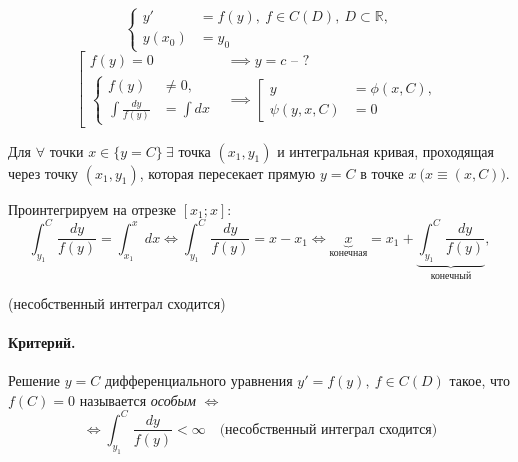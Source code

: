 \documentclass[11pt,a4paper,oneside]{report}
\theoremstyle{definition}
\theoremstyle{plain}
\theoremstyle{remark}
\begin{document}
\begin{equation*}
    \left\{\begin{array}{rl}
        y'     & = f(y), \ f \in C(D), \ D \subset\mathbb{R}, \\
        y(x_0) & = y_0
    \end{array}\right.
\end{equation*}
\begin{equation*}
    \left[\begin{array}{rl}
        f(y) = 0                           & \implies y = c\text{ -- ?}       \\
        \left\{\begin{array}{rl}
                   f(y)                & \ne 0,    \\
                   \int\frac{dy}{f(y)} & = \int dx
               \end{array}\right. & \implies \left[\begin{array}{rl}
                                                       y           & = \phi(x,C), \\
                                                       \psi(y,x,C) & = 0
                                                   \end{array}\right.
    \end{array}\right.
\end{equation*}

Для $\forall$ точки $x \in \{y = C\} \ \exists$ точка $(x_1,y_1)$ и интегральная кривая, проходящая через точку $(x_1,y_1)$, которая пересекает прямую $y = C$ в точке $x \ \big(x \equiv (x,C)\big)$.

Проинтегрируем на отрезке $[x_1;x]$:
\begin{equation*}
    \int_{y_1}^{C}\frac{dy}{f(y)} = \int_{x_1}^{x}dx \iff \int_{y_1}^{C}\frac{dy}{f(y)} = x-x_1 \iff \underbrace{x}_{\text{конечная}} = x_1 + \underbrace{\int_{y_1}^{C}\frac{dy}{f(y)}}_{\text{конечный}},
\end{equation*}
\begin{center}
    (несобственный интеграл сходится)
\end{center}

\paragraph*{Критерий.}

Решение $y = C$ дифференциального уравнения $y' = f(y), \ f\in C(D)$ такое, что $f(C) = 0$ называется \emph{особым} $\iff$
\begin{equation*}
    \iff \int_{y_1}^{C}\frac{dy}{f(y)} < \infty \quad \text{(несобственный интеграл сходится)}
\end{equation*}
\end{document}
